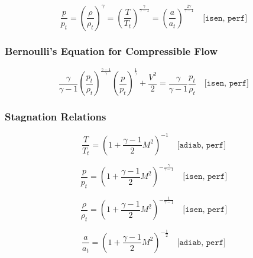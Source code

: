 \begin{equation}
	\frac{p}{p_t} = \left( \frac{\rho}{\rho_t} \right)^\gamma = \left( \frac{T}{T_t} \right)^{\frac{\gamma}{\gamma - 1}} = \left( \frac{a}{a_t} \right)^{\frac{2\gamma}{\gamma - 1}}
	\quad \texttt{[isen, perf]}
\end{equation}

\subsubsection*{Bernoulli's Equation for Compressible Flow}

\begin{equation}
	\frac{\gamma}{\gamma - 1} \left( \frac{p_t}{\rho_t} \right)^{\frac{\gamma - 1}{\gamma}} \left( \frac{p}{p_t} \right)^{\frac{1}{\gamma}} + \frac{V^2}{2} = \frac{\gamma}{\gamma - 1} \frac{p_t}{\rho_t} 
	\quad \texttt{[isen, perf]}
\end{equation}

\subsubsection*{Stagnation Relations}

\begin{equation}
	\frac{T}{T_t} = \left( 1 + \frac{\gamma - 1}{2} M^2 \right)^{-1}
	\quad \texttt{[adiab, perf]}
	\label{eq:total_relation_T}
\end{equation}

\begin{equation}
	\frac{p}{p_t} = \left( 1 + \frac{\gamma - 1}{2} M^2 \right)^{-\frac{\gamma}{\gamma - 1}}
	\quad \texttt{[isen, perf]}
	\label{eq:total_relation_p}
\end{equation}

\begin{equation}
	\frac{\rho}{\rho_t} = \left( 1 + \frac{\gamma - 1}{2} M^2 \right)^{-\frac{1}{\gamma - 1}}
	\quad \texttt{[isen, perf]}
	\label{eq:total_relation_rho}
\end{equation}

\begin{equation}
	\frac{a}{a_t} = \left( 1 + \frac{\gamma - 1}{2} M^2 \right)^{-\frac{1}{2}}
	\quad \texttt{[adiab, perf]}
\end{equation}
